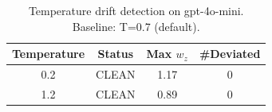 \begin{table}[h]
\centering
\caption{Temperature drift detection on gpt-4o-mini. Baseline: T=0.7 (default).}
\label{tab:temperature}
\begin{tabular}{cccc}
\toprule
\textbf{Temperature} & \textbf{Status} & \textbf{Max $w_z$} & \textbf{\#Deviated} \\
\midrule
0.2 & CLEAN & 1.17 & 0 \\
1.2 & CLEAN & 0.89 & 0 \\
\bottomrule
\end{tabular}
\end{table}